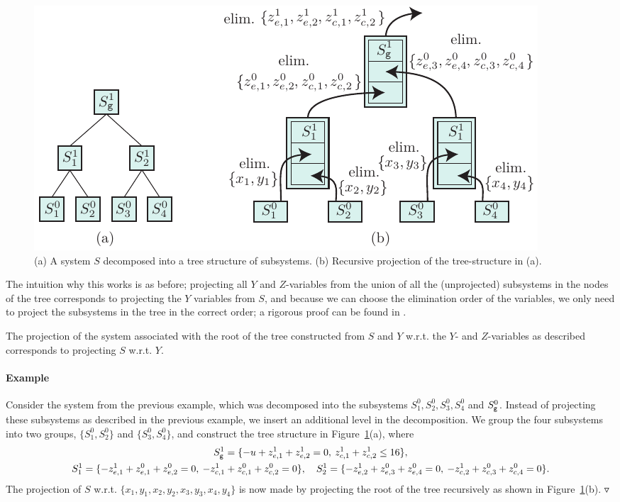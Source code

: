 \begin{figure}
	\centering
		\includegraphics{figures/Example3.pdf}
	\caption{(a) A system $S$ decomposed into a tree structure of subsystems. (b) Recursive projection of the tree-structure in (a).}
	\label{fig:decomp2}
\end{figure}

The intuition why this works is as before; projecting all $Y$ and $Z$-variables from the union of all the (unprojected) subsystems in the nodes of the tree corresponds to projecting the $Y$ variables from $S$, and because we can choose the elimination order of the variables, we only need to project the subsystems in the tree in the correct order; a rigorous proof can be found in \cite{MyTechRep}.

\begin{prop}
The projection of the system associated with the root of the tree constructed from $S$ and $Y$ w.r.t. the $Y$- and $Z$-variables as described corresponds to projecting $S$ w.r.t. $Y$.
\end{prop}

\paragraph{Example}
Consider the system from the previous example, which was decomposed into the subsystems $S^0_1, S_2^0, S_3^0, S^0_4$ and $S^0_{\texttt{g}}$. Instead of projecting these subsystems as described in the previous example, we insert an additional level in the decomposition. We group the four subsystems into two groups, $\{S^0_1, S^0_2\}$ and $\{S^0_3, S^0_4\}$, and construct the tree structure in Figure~\ref{fig:decomp2}(a), where 
\small{\begin{gather*}
S_{\texttt{g}}^1 = \{-u + z^1_{e,1} + z^1_{e,2} = 0,\: z^1_{c,1} + z^1_{c,2} \leq 16 \},\\   
S^1_1=\{-z^1_{e,1} + z^0_{e,1} + z^0_{e,2} = 0,\: -z^1_{c,1} + z^0_{c,1} + z^0_{c,2} = 0\}, 
\quad S^1_2=\{-z^1_{e,2} +z^0_{e,3}+ z^0_{e,4} = 0,\: -z^1_{c,2} +z^0_{c,3}+ z^0_{c,4} = 0\}. 
\end{gather*}}
\normalsize{The projection of $S$ w.r.t. $\{x_1,y_1,x_2,y_2,x_3,y_3,x_4,y_4\}$ is now made by projecting the root of the tree recursively as shown in Figure~\ref{fig:decomp2}(b).} {$\triangledown$}

